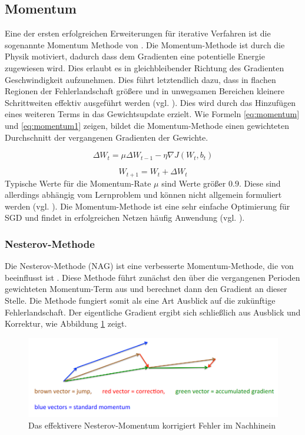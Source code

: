 \subsection{Momentum}
Eine der ersten erfolgreichen Erweiterungen für iterative Verfahren ist die sogenannte Momentum Methode von \cite{Polyak1964}.
Die Momentum-Methode ist durch die Physik motiviert, dadurch dass dem Gradienten eine potentielle Energie zugewiesen wird. Dies erlaubt es in gleichbleibender Richtung des Gradienten Geschwindigkeit aufzunehmen. Dies führt letztendlich dazu, dass in flachen Regionen der Fehlerlandschaft größere und in unwegsamen Bereichen kleinere Schrittweiten effektiv ausgeführt werden (vgl. \cite{LeCun1998b}).
Dies wird durch das Hinzufügen eines weiteren Terms in das Gewichtsupdate erzielt. Wie Formeln \ref{eq:momentum} und \ref{eq:momentum1} zeigen, bildet die Momentum-Methode einen gewichteten Durchschnitt der vergangenen Gradienten der Gewichte. 
 
\begin{equation}
\label{eq:momentum} 
\Delta W_t = \mu \Delta W_{t-1} - \eta \nabla J(W_t,b_t)
\end{equation} 
 
\begin{equation}
\label{eq:momentum1} 
W_{t+1} = W_t + \Delta W_t
\end{equation}
Typische Werte für die Momentum-Rate $\mu$ sind Werte größer $0.9$. Diese sind allerdings abhängig vom Lernproblem und können nicht allgemein formuliert werden (vgl. \cite{Kaparthy2014}). Die Momentum-Methode ist eine sehr einfache Optimierung für SGD und findet in erfolgreichen Netzen häufig Anwendung (vgl. \cite{Krizhevsky2012}).

\subsubsection{Nesterov-Methode}
Die Nesterov-Methode (NAG) ist eine verbesserte Momentum-Methode, die von \cite{Nesterov1983} beeinflusst ist \cite[vgl. hierzu und im Folgenden][]{Sutskever2013b}. Diese Methode führt zunächst den über die vergangenen Perioden gewichteten Momentum-Term aus und berechnet dann den Gradient an dieser Stelle. Die Methode fungiert somit als eine Art Ausblick auf die zukünftige Fehlerlandschaft. Der eigentliche Gradient ergibt sich schließlich aus Ausblick und Korrektur, wie Abbildung \ref{fig:4_nesterov} zeigt.
\begin{figure}
\centering
\includegraphics[width=0.7\linewidth]{images/4_nesterov}
\caption[]{Das effektivere Nesterov-Momentum korrigiert Fehler im Nachhinein\cite[siehe][]{Hinton2015} }%
\label{fig:4_nesterov}
\end{figure}

